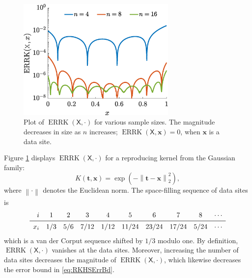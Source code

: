 \documentclass[]{mcom-l}
\theoremstyle{plain}
\theoremstyle{definition}
\DeclareMathOperator{\errK}{ERRK}
\newcommand{\mX}{\mathsf{X}}
\newcommand{\bx}{{\boldsymbol{x}}}
\newcommand{\bt}{{\boldsymbol{t}}}
\newcommand{\norm}[2][{}]{\ensuremath{\left \lVert #2 \right \rVert}_{#1}}
\begin{document}
\begin{figure}[H]
	\centering
	\includegraphics[height =6cm]{ProgramsImages/errGaussKplot.eps}
	\caption{Plot of $\errK(\mX,\cdot)$ for various sample sizes.  The magnitude decreases in size as $n$ increases; $\errK(\mX,\bx) = 0$, when $\bx$ is a data site. \label{fig:errK}}
\end{figure}

Figure \ref{fig:errK} displays   $\errK(\mX,\cdot)$  for a reproducing kernel from the Gaussian family: 
	\begin{equation} \label{eq:GaussianOne}
K(\bt,\bx) =  \exp(-\norm[2]{\bt-\bx}^2),
\end{equation}
where $\norm{\cdot}$ denotes the Euclidean norm.  The space-filling sequence of data sites is 
\begin{equation} \label{eq:FixedVDCDes}
\begin{array}{rccccccccc}
i  & 1 & 2 & 3 & 4 & 5 & 6 & 7 & 8 & \cdots\\
\midrule
x_i & 1/3 & 5/6 & 7/12 & 1/12 & 11/24 & 23/24 & 17/24 & 5 /24 & \cdots
\end{array}
\end{equation}
which is a van der Corput sequence \cite{} shifted by $1/3$ modulo one.  By definition, $\errK(\mX,\cdot)$ vanishes at the data sites.  Moreover, increasing the number of data sites decreases the magnitude of $\errK(\mX,\cdot)$, which likewise decreases the error bound in \eqref{eq:RKHSErrBd}.
\end{document}
